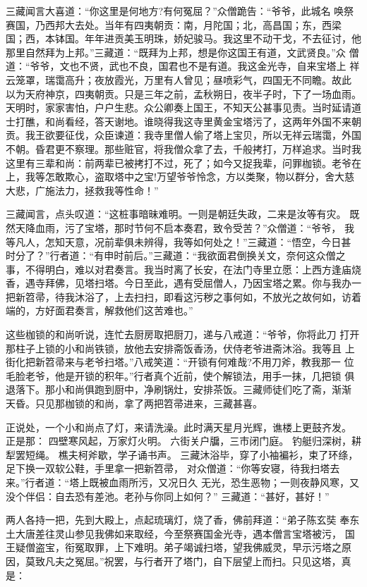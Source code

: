 三藏闻言大喜道：“你这里是何地方?有何冤屈？”众僧跪告：“爷爷，此城名
唤祭赛国，乃西邦大去处。当年有四夷朝贡：南，月陀国；北，高昌国；东，西梁
国；西，本钵国。年年进贡美玉明珠，娇妃骏马。我这里不动干戈，不去征讨，他
那里自然拜为上邦。”三藏道：“既拜为上邦，想是你这国王有道，文武贤良。”众
僧道：“爷爷，文也不贤，武也不良，国君也不是有道。我这金光寺，自来宝塔上
祥云笼罩，瑞霭高升；夜放霞光，万里有人曾见；昼喷彩气，四国无不同瞻。故此
以为天府神京，四夷朝贡。只是三年之前，孟秋朔日，夜半子时，下了一场血雨。
天明时，家家害怕，户户生悲。众公卿奏上国王，不知天公甚事见责。当时延请道
士打醮，和尚看经，答天谢地。谁晓得我这寺里黄金宝塔污了，这两年外国不来朝
贡。我王欲要征伐，众臣谏道：我寺里僧人偷了塔上宝贝，所以无祥云瑞霭，外国
不朝。昏君更不察理。那些赃官，将我僧众拿了去，千般拷打，万样追求。当时我
这里有三辈和尚：前两辈已被拷打不过，死了；如今又捉我辈，问罪枷锁。老爷在
上，我等怎敢欺心，盗取塔中之宝!万望爷爷怜念，方以类聚，物以群分，舍大慈
大悲，广施法力，拯救我等性命！”

三藏闻言，点头叹道：“这桩事暗昧难明。一则是朝廷失政，二来是汝等有灾。
既然天降血雨，污了宝塔，那时节何不启本奏君，致令受苦？”众僧道：“爷爷，
我等凡人，怎知天意，况前辈俱未辨得，我等如何处之！”三藏道：“悟空，今日甚
时分了？”行者道：“有申时前后。”三藏道：“我欲面君倒换关文，奈何这众僧之
事，不得明白，难以对君奏言。我当时离了长安，在法门寺里立愿：上西方逢庙烧
香，遇寺拜佛，见塔扫塔。今日至此，遇有受屈僧人，乃因宝塔之累。你与我办一
把新笤帚，待我沐浴了，上去扫扫，即看这污秽之事何如，不放光之故何如，访着
端的，方好面君奏言，解救他们这苦难也。”

这些枷锁的和尚听说，连忙去厨房取把厨刀，递与八戒道：“爷爷，你将此刀
打开那柱子上锁的小和尚铁锁，放他去安排斋饭香汤，伏侍老爷进斋沐浴。我等且
上街化把新笤帚来与老爷扫塔。”八戒笑道：“开锁有何难哉?不用刀斧，教我那一
位毛脸老爷，他是开锁的积年。”行者真个近前，使个解锁法，用手一抹，几把锁
俱退落下。那小和尚俱跑到厨中，净刷锅灶，安排茶饭。三藏师徒们吃了斋，渐渐
天昏。只见那枷锁的和尚，拿了两把笤帚进来，三藏甚喜。

正说处，一个小和尚点了灯，来请洗澡。此时满天星月光辉，谯楼上更鼓齐发。
正是那：
四壁寒风起，万家灯火明。
六街关户牖，三市闭门庭。
钓艇归深树，耕犁罢短绳。
樵夫柯斧歇，学子诵书声。
三藏沐浴毕，穿了小袖褊衫，束了环绦，足下换一双软公鞋，手里拿一把新笤帚，
对众僧道：“你等安寝，待我扫塔去来。”行者道：“塔上既被血雨所污，又况日久
无光，恐生恶物；一则夜静风寒，又没个伴侣：自去恐有差池。老孙与你同上如何？”
三藏道：“甚好，甚好！”

两人各持一把，先到大殿上，点起琉璃灯，烧了香，佛前拜道：“弟子陈玄奘
奉东土大唐差往灵山参见我佛如来取经，今至祭赛国金光寺，遇本僧言宝塔被污，
国王疑僧盗宝，衔冤取罪，上下难明。弟子竭诚扫塔，望我佛威灵，早示污塔之原
因，莫致凡夫之冤屈。”祝罢，与行者开了塔门，自下层望上而扫。只见这塔，真
是：

